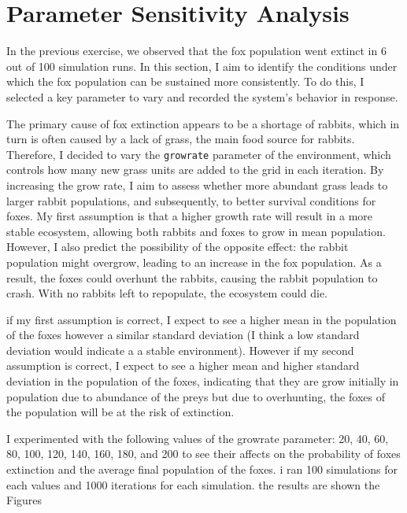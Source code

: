 \section{Parameter Sensitivity Analysis }

In the previous exercise, we observed that the fox population went extinct in 6 out of 100 simulation runs. In this section, I aim to identify the conditions under which the fox population can be sustained more consistently. To do this, I selected a key parameter to vary and recorded the system's behavior in response.

The primary cause of fox extinction appears to be a shortage of rabbits, which in turn is often caused by a lack of grass, the main food source for rabbits. Therefore, I decided to vary the \texttt{growrate} parameter of the environment, which controls how many new grass units are added to the grid in each iteration. By increasing the grow rate, I aim to assess whether more abundant grass leads to larger rabbit populations, and subsequently, to better survival conditions for foxes.
My first assumption is that a higher growth rate will result in a more stable ecosystem, allowing both rabbits and foxes to grow in mean population. However, I also predict the possibility of the opposite effect: the rabbit population might overgrow, leading to an increase in the fox population. As a result, the foxes could overhunt the rabbits, causing the rabbit population to crash. With no rabbits left to repopulate, the ecosystem could die.

if my first assumption is correct, I expect to see a higher mean in the population of the foxes however a similar standard deviation (I think a low standard deviation would indicate a a stable environment). However if my second assumption is correct, I expect to see a higher mean and higher standard deviation in the population of the foxes, indicating that they are grow initially in population due to abundance of the preys but due to overhunting, the foxes of the population will be at the risk of extinction.

I experimented with the following values of the growrate parameter: 20, 40, 60, 80, 100, 120, 140, 160, 180, and 200 to see their affects on the probability of foxes extinction and the average final population of the foxes. i ran 100 simulations for each values and 1000 iterations for each simulation. the results are shown the Figures 